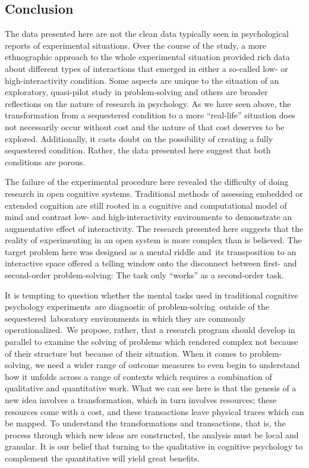 {{
\subsection{Conclusion}

The data presented here are not the clean data typically seen in psychological reports of experimental situations. Over the course of the study, a more ethnographic approach to the whole experimental situation provided rich data about different types of interactions that emerged in either a so-called low- or high-interactivity condition. Some aspects are unique to the situation of an exploratory, quasi-pilot study in problem-solving and others are broader reflections on the nature of research in psychology. As we have seen above, the transformation from a sequestered condition to a more ``real-life'' situation does not necessarily occur without cost and the nature of that cost deserves to be explored. Additionally, it casts doubt on the possibility of creating a fully sequestered condition. Rather, the data presented here suggest that both conditions are porous.

The failure of the experimental procedure here revealed the difficulty of doing research in open cognitive systems. Traditional methods of assessing embedded or extended cognition are still rooted in a cognitive and computational model of mind and contrast low- and high-interactivity environments to demonstrate an augmentative effect of interactivity. The research presented here suggests that the reality of experimenting in an open system is more complex than is believed. The target problem here was designed as a mental riddle and~its transposition to an interactive space offered a telling window onto the disconnect between first- and second-order problem-solving: The task only ``works'' as a second-order task.

It is tempting to question whether the mental tasks used in traditional cognitive psychology experiments~are diagnostic of problem-solving~outside of the sequestered~laboratory environments in which they are commonly operationalized.~We propose, rather, that a research program should develop in parallel to examine the solving of problems which rendered complex not because of their structure but because of their situation. When it comes to problem-solving, we need a wider range of outcome measures to even begin to understand how it unfolds across a range of contexts which requires a combination of qualitative and quantitative work. What we can see here is that the genesis of a new idea involves a transformation, which in turn involves resources; these resources come with a cost, and these transactions leave physical traces which can be mapped. To understand the transformations and transactions, that is, the process through which new ideas are constructed, the analysis must be local and granular. It is our belief that turning to the qualitative in cognitive psychology to complement the quantitative will yield great benefits.

}}
